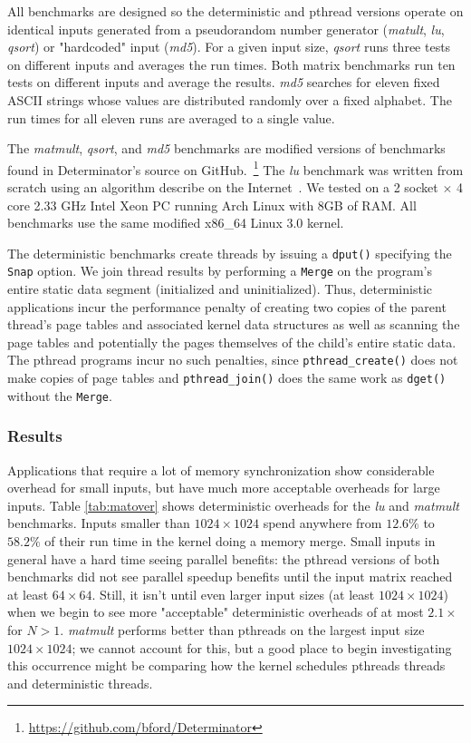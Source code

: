 All benchmarks are designed so the deterministic and pthread versions operate on
identical inputs generated from a pseudorandom number generator (\emph{matult},
\emph{lu}, \emph{qsort}) or "hardcoded" input (\emph{md5}).
For a given input size, \emph{qsort} runs three tests on different inputs and
averages the run times. Both matrix benchmarks run ten tests on different inputs
and average the results. \emph{md5} searches for eleven fixed ASCII strings
whose values are distributed randomly over a fixed alphabet. The run times for
all eleven runs are averaged to a single value.

The \emph{matmult}, \emph{qsort}, and \emph{md5} benchmarks are modified
versions of benchmarks found in Determinator's source on
GitHub.~\footnote{\url{https://github.com/bford/Determinator}}
The \emph{lu} benchmark was written from scratch using an algorithm describe
on the Internet~\cite{lualg}. We tested on a 2 socket $\times$ 4 core 2.33 GHz
Intel Xeon PC running Arch Linux with 8GB of RAM. All benchmarks use the same
modified \mbox{x86\_64} Linux 3.0 kernel.

The deterministic benchmarks create threads by issuing a {\tt dput()} specifying
the {\tt Snap} option. We join thread results by performing a {\tt Merge} on the
program's entire static data segment (initialized and uninitialized). Thus,
deterministic applications incur the performance penalty of creating two copies
of the parent thread's page tables and associated kernel data structures
as well as scanning the page tables and potentially the pages
themselves of the child's entire static data. The pthread programs incur no
such penalties, since \mbox{{\tt pthread\_create()}} does not make copies of
page tables and \mbox{{\tt pthread\_join()}} does the same work as {\tt dget()}
without the {\tt Merge}.

\subsubsection{Results}
Applications that require a lot of memory synchronization show considerable
overhead for small inputs, but have much more acceptable overheads for large
inputs.
Table \ref{tab:matover} shows deterministic overheads for the \emph{lu} and
\emph{matmult} benchmarks.
Inputs smaller than $1024\times 1024$ spend anywhere from $12.6\%$ to $58.2\%$
of their run time in the kernel doing a memory merge.
Small inputs in general have a hard time seeing parallel benefits: the pthread
versions of both benchmarks did not see parallel speedup benefits until the
input matrix reached at least $64\times 64$. Still, it isn't until even larger
input sizes (at least $1024\times 1024$) when we begin to
see more "acceptable" deterministic overheads of at
most $2.1\times$ for $N>1$. \emph{matmult}
performs better than pthreads on the largest input size $1024\times 1024$; we
cannot account for this, but a good place to begin investigating this
occurrence might be comparing how the kernel schedules pthreads threads and
deterministic threads.

